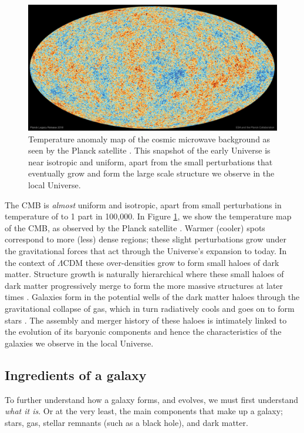 \begin{figure}
	\includegraphics[width=\linewidth]{thesis/latex/introduction/planck_cmb_2018.jpg}
    \caption{Temperature anomaly map of the cosmic microwave background as seen by the Planck satellite \citep{planck2018i}. This snapshot of the early Universe is near isotropic and uniform, apart from the small perturbations that eventually grow and form the large scale structure we observe in the local Universe.}
    \label{fig:cmb_planck}
\end{figure}

The CMB is \textit{almost} uniform and isotropic, apart from small perturbations in temperature of to 1 part in 100,000. In Figure \ref{fig:cmb_planck}, we show the temperature map of the CMB, as observed by the Planck satellite \citep{planck2018i}. Warmer (cooler) spots correspond to more (less) dense regions; these slight perturbations grow under the gravitational forces that act through the Universe's expansion to today. In the context of $\Lambda$CDM these over-densities grow to form small haloes of dark matter. Structure growth is naturally hierarchical where these small haloes of dark matter progressively merge to form the more massive structures at later times \citep{press1974}. Galaxies form in the potential wells of the dark matter haloes through the gravitational collapse of gas, which in turn radiatively cools and goes on to form stars \citep{white1978}. The assembly and merger history of these haloes is intimately linked to the evolution of its baryonic components and hence the characteristics of the galaxies we observe in the local Universe.

\subsection{Ingredients of a galaxy}
To further understand how a galaxy forms, and evolves, we must first understand \textit{what it is}. Or at the very least, the main components that make up a galaxy; stars, gas, stellar remnants (such as a black hole), and dark matter. 

